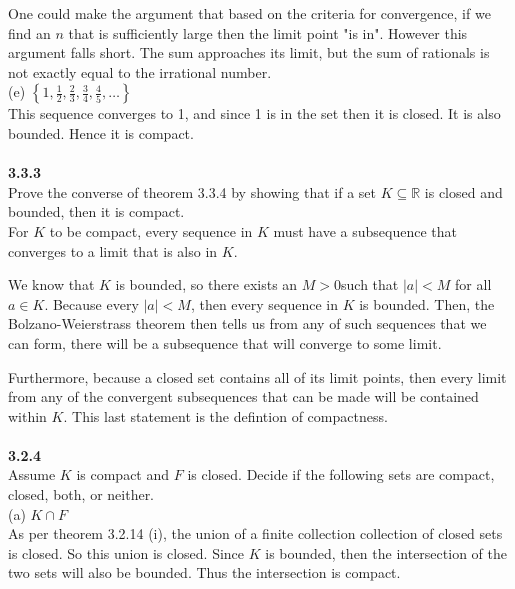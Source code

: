 One could make the argument that based on the criteria for convergence, if we find an $n$ that is sufficiently large
then the limit point "is in".
However this argument falls short. The sum approaches its limit, but the sum of rationals is not exactly equal
to the irrational number. 
\\

(e) $\left\{ 1, \frac{1}{2}, \frac{2}{3}, \frac{3}{4}, \frac{4}{5}, \ldots \right\}$
\\

This sequence converges to 1, and since 1 is in the set then it is closed.
It is also bounded.
Hence it is compact.
\\~\\



\textbf{3.3.3}
\\

Prove the converse of theorem 3.3.4 by showing that if a set $K \subseteq \mathbb{R}$ is closed and bounded,
then it is compact.
\\

For $K$ to be compact, every sequence in $K$ must have a subsequence that converges to a limit that
is also in $K$.

We know that $K$ is bounded, so there exists an $M > 0$such that $|a| < M$ for all $a\in K$.
Because every $|a| < M$, then every sequence in $K$ is bounded.
Then, the Bolzano-Weierstrass theorem then tells us from any of such sequences that we can form, there will be a
subsequence that will converge to some limit.

Furthermore, because a closed set contains all of its limit points, then every limit from any of the
convergent subsequences that can be made will be contained within $K$.
This last statement is the defintion of compactness.
\\~\\




\textbf{3.2.4}
\\

Assume $K$ is compact and $F$ is closed.
Decide if the following sets are compact, closed, both, or neither.
\\

(a) $K \cap F$
\\

As per theorem 3.2.14 (i), the union of a finite collection collection of closed sets is closed.
So this union is closed.
Since $K$ is bounded, then the intersection of the two sets will also be bounded.
Thus the intersection is compact.
\\

